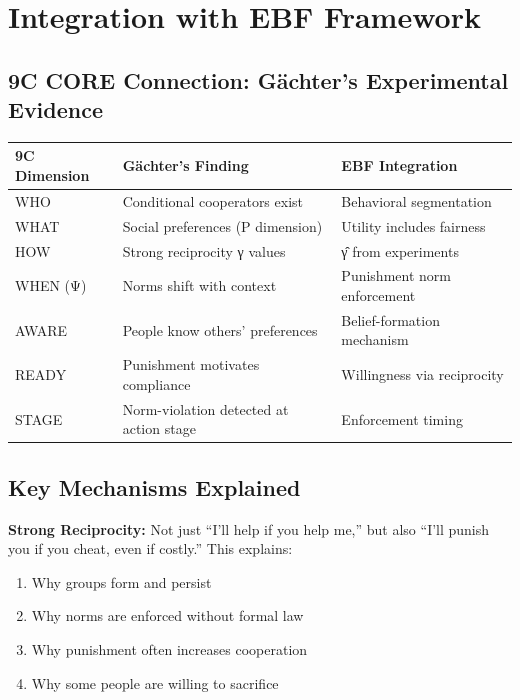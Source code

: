 \documentclass[11pt]{article}
\begin{document}
\section*{Integration with EBF Framework}

\subsection*{9C CORE Connection: Gächter's Experimental Evidence}

\begin{tabular}{|l|l|l|}
\hline
\textbf{9C Dimension} & \textbf{Gächter's Finding} & \textbf{EBF Integration} \\
\hline
WHO & Conditional cooperators exist & Behavioral segmentation \\
\hline
WHAT & Social preferences (P dimension) & Utility includes fairness \\
\hline
HOW & Strong reciprocity γ values & γ̂ from experiments \\
\hline
WHEN (Ψ) & Norms shift with context & Punishment norm enforcement \\
\hline
AWARE & People know others' preferences & Belief-formation mechanism \\
\hline
READY & Punishment motivates compliance & Willingness via reciprocity \\
\hline
STAGE & Norm-violation detected at action stage & Enforcement timing \\
\hline
\end{tabular}

\subsection*{Key Mechanisms Explained}

\textbf{Strong Reciprocity:} Not just ``I'll help if you help me,'' but also
``I'll punish you if you cheat, even if costly.'' This explains:
\begin{enumerate}
    \item Why groups form and persist
    \item Why norms are enforced without formal law
    \item Why punishment often increases cooperation
    \item Why some people are willing to sacrifice
\end{enumerate}
\end{document}
